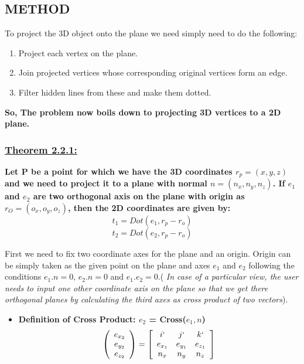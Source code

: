 \documentclass[12pt]{article}
\begin{document}
\subsection{METHOD}

To project the 3D object onto the plane we need simply need to do the following:

\begin{enumerate}

\item Project each vertex on the plane. 
\item Join projected vertices whose corresponding original vertices form an edge. 
\item Filter hidden lines from these and make them dotted.

\end{enumerate}




\textbf{So, The problem now boils down to projecting 3D vertices to a 2D plane.}

\subsubsection*{\underline{Theorem 2.2.1:}}

\textbf{Let P be a point for which we have the 3D coordinates $r_p = (x,y,z)$ and we need to project it to a plane with normal $n = (n_x,n_y,n_z)$. If $e_1$ and $e_2$ are two orthogonal axis on the plane with origin as $r_O = (o_x, o_y, o_z)$, then the 2D coordinates are given by:
$$ t_1 =  Dot(e_1, r_p - r_o)$$ $$ t_2 = Dot(e_2,r_p - r_o) $$}

\bigskip

First we need to fix two coordinate axes for the plane and an origin. Origin can be simply taken as the given point on the plane and axes $e_1$ and $e_2$ following the conditions $e_1.n = 0$, $e_2.n = 0$ and $e_1.e_2 = 0$.(\textit{ In case of a particular view, the user needs to input one other coordinate axis on the plane so that we get there orthogonal planes by calculating the third axes as cross product of two vectors}).

\begin{itemize}

    \item \textbf{Definition of Cross Product: $e_2$ = Cross($e_1, n$)}
    \[
            \left(\begin{array}{c} e_{x_2} \\ e_{y_2} \\ e_{z_2} \end{array}\right)=
            \left[ {\begin{array}{ccc}
            i^^ & j^^ & k^^ \\
            e_{x_1} & e_{y_1} & e_{z_1}\\
            n_x & n_y & n_z
            \end{array} } \right]
            \]

    
\end{itemize}
\end{document}
